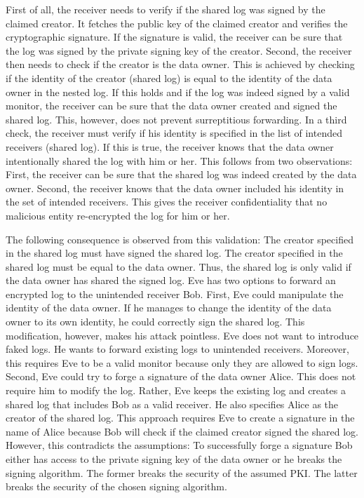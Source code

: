 \documentclass[../main.tex]{subfiles}
\begin{document}
First of all, the receiver needs to verify if the shared log was signed by the claimed creator.
It fetches the public key of the claimed creator and verifies the cryptographic signature.
If the signature is valid, the receiver can be sure that the log was signed by the private signing key of the creator.
Second, the receiver then needs to check if the creator is the data owner. 
This is achieved by checking if the identity of the creator (shared log) is equal to the identity of the data owner in the nested log.
If this holds and if the log was indeed signed by a valid monitor, the receiver can be sure that the data owner created and signed the shared log.
This, however, does not prevent surreptitious forwarding.
In a third check, the receiver must verify if his identity is specified in the list of intended receivers (shared log).
If this is true, the receiver knows that the data owner intentionally shared the log with him or her.
This follows from two observations:
First, the receiver can be sure that the shared log was indeed created by the data owner.
Second, the receiver knows that the data owner included his identity in the set of intended receivers.
This gives the receiver confidentiality that no malicious entity re-encrypted the log for him or her.

The following consequence is observed from this validation:
The creator specified in the shared log must have signed the shared log.
The creator specified in the shared log must be equal to the data owner.
Thus, the shared log is only valid if the data owner has shared the signed log.
Eve has two options to forward an encrypted log to the unintended receiver Bob. 
First, Eve could manipulate the identity of the data owner.
If he manages to change the identity of the data owner to its own identity, he could correctly sign the shared log.
This modification, however, makes his attack pointless.
Eve does not want to introduce faked logs.
He wants to forward existing logs to unintended receivers.
Moreover, this requires Eve to be a valid monitor because only they are allowed to sign logs.
Second, Eve could try to forge a signature of the data owner Alice.
This does not require him to modify the log.
Rather, Eve keeps the existing log and creates a shared log that includes Bob as a valid receiver.
He also specifies Alice as the creator of the shared log.
This approach requires Eve to create a signature in the name of Alice because Bob will check if the claimed creator signed the shared log.
However, this contradicts the assumptions:
To successfully forge a signature Bob either has access to the private signing key of the data owner or he breaks the signing algorithm.
The former breaks the security of the assumed PKI.
The latter breaks the security of the chosen signing algorithm.
\end{document}
